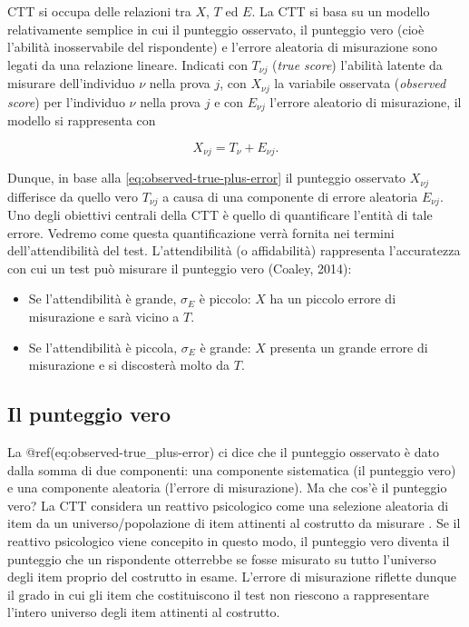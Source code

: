 \documentclass[
  11pt,
]{krantz}
\providecommand{\tightlist}{%
  \setlength{\itemsep}{0pt}\setlength{\parskip}{0pt}}
\theoremstyle{definition}
\theoremstyle{definition}
\theoremstyle{definition}
\theoremstyle{definition}
\theoremstyle{remark}
\begin{document}
CTT si occupa delle relazioni tra \(X\), \(T\) ed \(E\). La CTT si basa su un modello relativamente semplice in cui il punteggio osservato, il punteggio vero (cioè l'abilità inosservabile del rispondente) e l'errore aleatoria di misurazione sono legati da una relazione lineare. Indicati con \(T_{\nu j}\) (\emph{true score}) l'abilità latente da misurare dell'individuo \(\nu\) nella prova \(j\), con \(X_{\nu j}\) la variabile osservata (\emph{observed score}) per l'individuo \(\nu\) nella prova \(j\) e con \(E_{\nu j}\) l'errore aleatorio di misurazione, il modello si rappresenta con

\[
X_{\nu j} = T_{\nu} + E_{\nu j}. 
\label{eq:observed-true-plus-error}
\]

Dunque, in base alla \eqref{eq:observed-true-plus-error} il punteggio osservato \(X_{\nu j}\) differisce da quello vero \(T_{\nu j}\) a causa di una componente di errore aleatoria \(E_{\nu j}\). Uno degli obiettivi centrali della CTT è quello di quantificare l'entità di tale errore. Vedremo come questa quantificazione verrà fornita nei termini dell'attendibilità del test. L'attendibilità (o affidabilità) rappresenta l'accuratezza con cui un test può misurare il punteggio vero (Coaley, 2014):

\begin{itemize}
\tightlist
\item
  Se l'attendibilità è grande, \(\sigma_E\) è piccolo: \(X\) ha un piccolo errore di misurazione e sarà vicino a \(T\).
\item
  Se l'attendibilità è piccola, \(\sigma_E\) è grande: \(X\) presenta un grande errore di misurazione e si discosterà molto da \(T\).
\end{itemize}

\hypertarget{il-punteggio-vero}{%
\subsection{Il punteggio vero}\label{il-punteggio-vero}}

La @ref(eq:observed-true\_plus-error) ci dice che il punteggio osservato è dato dalla somma di due componenti: una componente sistematica (il punteggio vero) e una componente aleatoria (l'errore di misurazione). Ma che cos'è il punteggio vero? La CTT considera un reattivo psicologico come una selezione aleatoria di item da un universo/popolazione di item attinenti al costrutto da misurare \citep{nunnally1994psychometric, kline2013handbook}. Se il reattivo psicologico viene concepito in questo modo, il punteggio vero diventa il punteggio che un rispondente otterrebbe se fosse misurato su tutto l'universo degli item proprio del costrutto in esame. L'errore di misurazione riflette dunque il grado in cui gli item che costituiscono il test non riescono a rappresentare l'intero universo degli item attinenti al costrutto.
\end{document}
